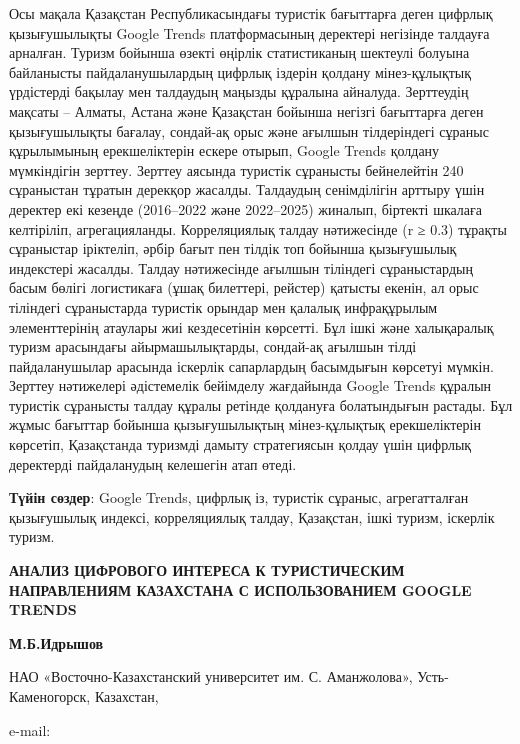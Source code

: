 Осы мақала Қазақстан Республикасындағы туристік бағыттарға деген цифрлық
қызығушылықты Google Trends платформасының деректері негізінде талдауға
арналған. Туризм бойынша өзекті өңірлік статистиканың шектеулі болуына
байланысты пайдаланушылардың цифрлық іздерін қолдану мінез-құлықтық
үрдістерді бақылау мен талдаудың маңызды құралына айналуда. Зерттеудің
мақсаты -- Алматы, Астана және Қазақстан бойынша негізгі бағыттарға
деген қызығушылықты бағалау, сондай-ақ орыс және ағылшын тілдеріндегі
сұраныс құрылымының ерекшеліктерін ескере отырып, Google Trends қолдану
мүмкіндігін зерттеу. Зерттеу аясында туристік сұранысты бейнелейтін 240
сұраныстан тұратын дерекқор жасалды. Талдаудың сенімділігін арттыру үшін
деректер екі кезеңде (2016--2022 және 2022--2025) жиналып, біртекті
шкалаға келтіріліп, агрегацияланды. Корреляциялық талдау нәтижесінде (r
≥ 0.3) тұрақты сұраныстар іріктеліп, әрбір бағыт пен тілдік топ бойынша
қызығушылық индекстері жасалды. Талдау нәтижесінде ағылшын тіліндегі
сұраныстардың басым бөлігі логистикаға (ұшақ билеттері, рейстер) қатысты
екенін, ал орыс тіліндегі сұраныстарда туристік орындар мен қалалық
инфрақұрылым элементтерінің атаулары жиі кездесетінін көрсетті. Бұл ішкі
және халықаралық туризм арасындағы айырмашылықтарды, сондай-ақ ағылшын
тілді пайдаланушылар арасында іскерлік сапарлардың басымдығын көрсетуі
мүмкін. Зерттеу нәтижелері әдістемелік бейімделу жағдайында Google
Trends құралын туристік сұранысты талдау құралы ретінде қолдануға
болатындығын растады. Бұл жұмыс бағыттар бойынша қызығушылықтың
мінез-құлықтық ерекшеліктерін көрсетіп, Қазақстанда туризмді дамыту
стратегиясын қолдау үшін цифрлық деректерді пайдаланудың келешегін атап
өтеді.

{\bfseries Түйін сөздер}: Google Trends, цифрлық із, туристік сұраныс,
агрегатталған қызығушылық индексі, корреляциялық талдау, Қазақстан, ішкі
туризм, іскерлік туризм.

{\bfseries АНАЛИЗ ЦИФРОВОГО ИНТЕРЕСА К ТУРИСТИЧЕСКИМ НАПРАВЛЕНИЯМ
КАЗАХСТАНА С ИСПОЛЬЗОВАНИЕМ GOOGLE TRENDS}

{\bfseries М.Б.Идрышов}

НАО «Восточно-Казахстанский университет им. С. Аманжолова»,
Усть-Каменогорск, Казахстан,

e-mail:~\href{mailto:immakhambet@gmail.com}{}

